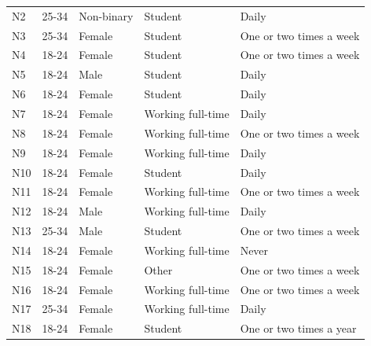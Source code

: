 \begin{table}[t]
\begin{tabular}{@{}p{2.5cm} p{2cm} p{2.5cm} p{4cm} p{4cm}@{}}
N2              & 25-34        & Non-binary & Student                      & Daily                       \\
N3              & 25-34        & Female                  & Student                      & One or two times a week     \\
N4              & 18-24        & Female                  & Student                      & One or two times a week     \\
N5              & 18-24        & Male                    & Student                      & Daily                       \\
N6              & 18-24        & Female                  & Student                      & Daily                       \\
N7              & 18-24        & Female                  & Working full-time             & Daily                       \\
N8              & 18-24        & Female                  & Working full-time             & One or two times a week     \\
N9              & 18-24        & Female                  & Working full-time             & Daily                       \\
N10             & 18-24        & Female                  & Student                      & Daily                       \\
N11             & 18-24        & Female                  & Working full-time             & One or two times a week     \\
N12             & 18-24        & Male                    & Working full-time             & Daily                       \\
N13             & 25-34        & Male                    & Student                      & One or two times a week     \\
N14             & 18-24        & Female                  & Working full-time             & Never                       \\
N15             & 18-24        & Female                  & Other                        & One or two times a week     \\
N16             & 18-24        & Female                  & Working full-time             & One or two times a week     \\
N17             & 25-34        & Female                  & Working full-time             & Daily                       \\
N18             & 18-24        & Female                  & Student                      & One or two times a year     \\

\end{tabular}
\end{table}
